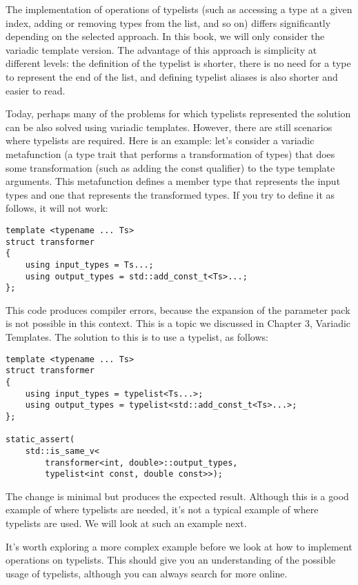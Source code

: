 The implementation of operations of typelists (such as accessing a type at a given index, adding or removing types from the list, and so on) differs significantly depending on the selected approach. In this book, we will only consider the variadic template version. The advantage of this approach is simplicity at different levels: the definition of the typelist is shorter, there is no need for a type to represent the end of the list, and defining typelist aliases is also shorter and easier to read.

Today, perhaps many of the problems for which typelists represented the solution can be also solved using variadic templates. However, there are still scenarios where typelists are required. Here is an example: let’s consider a variadic metafunction (a type trait that performs a transformation of types) that does some transformation (such as adding the const qualifier) to the type template arguments. This metafunction defines a member type that represents the input types and one that represents the transformed types. If you try to define it as follows, it will not work:

\begin{lstlisting}[style=styleCXX]
template <typename ... Ts>
struct transformer
{
	using input_types = Ts...;
	using output_types = std::add_const_t<Ts>...;
};
\end{lstlisting}

This code produces compiler errors, because the expansion of the parameter pack is not possible in this context. This is a topic we discussed in Chapter 3, Variadic Templates. The solution to this is to use a typelist, as follows:

\begin{lstlisting}[style=styleCXX]
template <typename ... Ts>
struct transformer
{
	using input_types = typelist<Ts...>;
	using output_types = typelist<std::add_const_t<Ts>...>;
};

static_assert(
	std::is_same_v<
		transformer<int, double>::output_types,
		typelist<int const, double const>>);
\end{lstlisting}

The change is minimal but produces the expected result. Although this is a good example of where typelists are needed, it’s not a typical example of where typelists are used. We will look at such an example next.


It’s worth exploring a more complex example before we look at how to implement operations on typelists. This should give you an understanding of the possible usage of typelists, although you can always search for more online.

